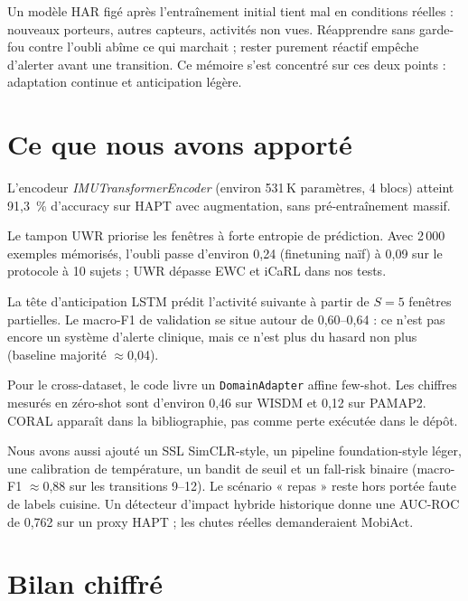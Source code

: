 \documentclass[a4paper,12pt]{report}
\begin{document}
Un modèle HAR figé après l'entraînement initial tient mal en conditions
réelles : nouveaux porteurs, autres capteurs, activités non vues. Réapprendre
sans garde-fou contre l'oubli abîme ce qui marchait ; rester purement réactif
empêche d'alerter avant une transition. Ce mémoire s'est concentré sur ces
deux points : adaptation continue et anticipation légère.

\section{Ce que nous avons apporté}

L'encodeur \emph{IMUTransformerEncoder} (environ 531\,K paramètres, 4 blocs)
atteint 91,3~\% d'accuracy sur HAPT avec augmentation, sans pré-entraînement
massif.

Le tampon UWR priorise les fenêtres à forte entropie de prédiction. Avec
2\,000 exemples mémorisés, l'oubli passe d'environ 0,24 (finetuning naïf) à
0,09 sur le protocole à 10 sujets ; UWR dépasse EWC et iCaRL dans nos tests.

La tête d'anticipation LSTM prédit l'activité suivante à partir de $S=5$
fenêtres partielles. Le macro-F1 de validation se situe autour de 0,60--0,64 :
ce n'est pas encore un système d'alerte clinique, mais ce n'est plus du
hasard non plus (baseline majorité $\approx$0,04).

Pour le cross-dataset, le code livre un \texttt{DomainAdapter} affine
few-shot. Les chiffres mesurés en zéro-shot sont d'environ 0,46 sur WISDM et
0,12 sur PAMAP2. CORAL apparaît dans la bibliographie, pas comme perte
exécutée dans le dépôt.

Nous avons aussi ajouté un SSL SimCLR-style, un pipeline foundation-style
léger, une calibration de température, un bandit de seuil et un fall-risk
binaire (macro-F1 $\approx$0,88 sur les transitions 9--12). Le scénario
« repas » reste hors portée faute de labels cuisine. Un détecteur d'impact
hybride historique donne une AUC-ROC de 0,762 sur un proxy HAPT ; les chutes
réelles demanderaient MobiAct.

\section{Bilan chiffré}
\end{document}
